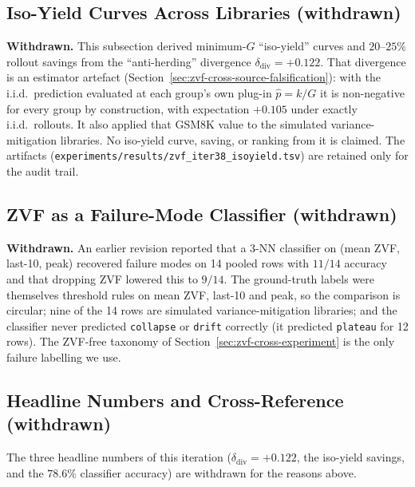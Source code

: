 
\subsection{Iso-Yield Curves Across Libraries (withdrawn)}
\label{sec:zvf-iso-yield}
\label{tab:zvf-isoyield-y80}
\textbf{Withdrawn.} This subsection derived minimum-$G$ ``iso-yield'' curves and
$20$--$25\%$ rollout savings from the ``anti-herding'' divergence
$\delta_{\mathrm{div}}=+0.122$. That divergence is an estimator artefact
(Section~\ref{sec:zvf-cross-source-falsification}): with the i.i.d.\ prediction
evaluated at each group's own plug-in $\hat p=k/G$ it is non-negative for every
group by construction, with expectation $+0.105$ under exactly i.i.d.\ rollouts.
It also applied that GSM8K value to the simulated variance-mitigation libraries.
No iso-yield curve, saving, or ranking from it is claimed. The artifacts
(\texttt{experiments/results/zvf\_iter38\_isoyield.tsv}) are retained only for
the audit trail.

\subsection{ZVF as a Failure-Mode Classifier (withdrawn)}
\label{sec:zvf-classifier}
\label{tab:zvf-classifier-conf}
\textbf{Withdrawn.} An earlier revision reported that a 3-NN classifier on
(mean ZVF, last-10, peak) recovered failure modes on 14 pooled rows with
$11/14$ accuracy and that dropping ZVF lowered this to $9/14$. The ground-truth
labels were themselves threshold rules on mean ZVF, last-10 and peak, so the
comparison is circular; nine of the 14 rows are simulated variance-mitigation
libraries; and the classifier never predicted \texttt{collapse} or
\texttt{drift} correctly (it predicted \texttt{plateau} for 12 rows). The
ZVF-free taxonomy of Section~\ref{sec:zvf-cross-experiment} is the only
failure labelling we use.

\subsection{Headline Numbers and Cross-Reference (withdrawn)}
\label{sec:zvf-iter38-headline}
The three headline numbers of this iteration ($\delta_{\mathrm{div}}=+0.122$,
the iso-yield savings, and the $78.6\%$ classifier accuracy) are withdrawn for
the reasons above.
